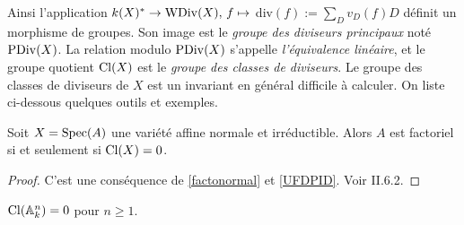 Ainsi l'application $k(X)^*\rightarrow \operatorname{WDiv}(X),\, f\mapsto $ div$(f):=\sum_D v_D(f)D$ définit un morphisme de groupes. Son image est le \textit{groupe des diviseurs principaux} noté $\operatorname{PDiv}(X)$. La relation modulo $\operatorname{PDiv}(X)$ s'appelle \textit{l'équivalence linéaire}, et le groupe quotient $\operatorname{Cl}(X)$ est le \textit{groupe des classes de diviseurs}. Le groupe des classes de diviseurs de $X$ est un invariant en général difficile à calculer. On liste ci-dessous quelques outils et exemples.


\begin{prop}\label{AffUFDClgTrifial}
Soit $X=\operatorname{Spec}(A)$ une variété affine normale et irréductible. Alors $A$ est factoriel si et seulement si $\operatorname{Cl}(X)=0$.
\end{prop}
\begin{proof}
C'est une conséquence de \ref{factonormal} et \ref{UFDPID}. Voir \cite{Hartshorne} II.6.2.
\end{proof}

\begin{cor}
$\operatorname{Cl}(\mathbb{A} ^n_k)=0$ pour $n\geq 1$.
\end{cor}


